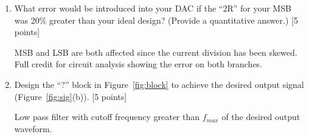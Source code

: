 \begin{enumerate}
\item What error would be introduced into your DAC if the ``2R'' for your MSB
was 20\% greater than your ideal design?  (Provide a quantitative answer.) [5
points]

MSB and LSB are both affected since the current division has been skewed.  Full credit for circuit analysis showing the error on both branches.

\item Design the ``?'' block in Figure~\ref{fig:block} to achieve the desired
output signal (Figure~\ref{fig:sig}(b)).  [5 points]

Low pass filter with cutoff frequency greater than $f_{max}$ of the desired output waveform.

\end{enumerate}

\clearpage
